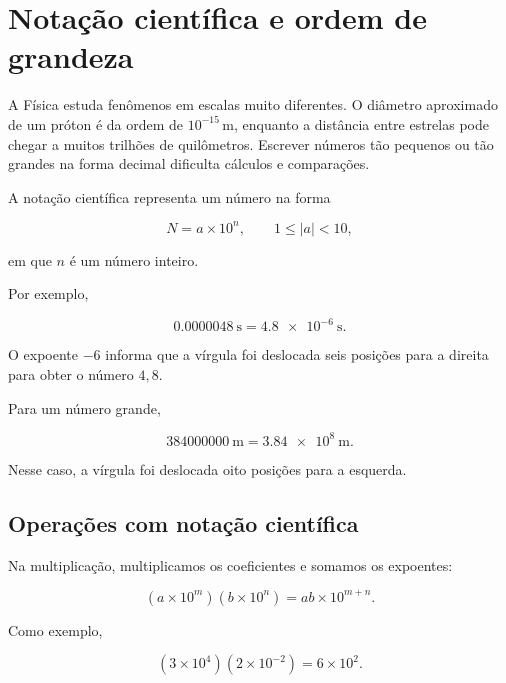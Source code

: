 \section{Notação científica e ordem de grandeza}

A Física estuda fenômenos em escalas muito diferentes. O diâmetro aproximado de um próton é da ordem de $10^{-15}\,\si{\meter}$, enquanto a distância entre estrelas pode chegar a muitos trilhões de quilômetros. Escrever números tão pequenos ou tão grandes na forma decimal dificulta cálculos e comparações.

A notação científica representa um número na forma

\begin{equation}
  N=a\times10^n,
  \qquad 1\leq |a|<10,
\end{equation}

em que $n$ é um número inteiro.

Por exemplo,

\begin{equation}
  \SI{0.0000048}{\second}
  =\SI{4.8e-6}{\second}.
\end{equation}

O expoente $-6$ informa que a vírgula foi deslocada seis posições para a direita para obter o número $4{,}8$.

Para um número grande,

\begin{equation}
  \SI{384000000}{\meter}
  =\SI{3.84e8}{\meter}.
\end{equation}

Nesse caso, a vírgula foi deslocada oito posições para a esquerda.

\subsection{Operações com notação científica}

Na multiplicação, multiplicamos os coeficientes e somamos os expoentes:

\begin{equation}
  \left(a\times10^m\right)\left(b\times10^n\right)
  =ab\times10^{m+n}.
\end{equation}

Como exemplo,

\begin{equation}
  \left(3\times10^4\right)\left(2\times10^{-2}\right)
  =6\times10^2.
\end{equation}

